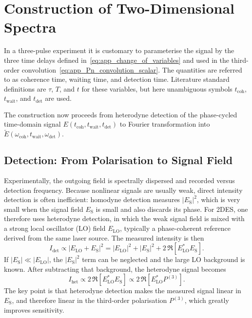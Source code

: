 \section{Construction of Two-Dimensional Spectra}
\label{sec:spctr_2D_construction_formal}
In a three-pulse experiment it is customary to parameterise the signal by the three time delays defined in~\autoref{eq:app_change_of_variables} and used in the third-order convolution~\autoref{eq:app_Pn_convolution_scalar}.
The quantities are referred to as coherence time, waiting time, and detection time. Literature standard definitions are $\tau$, $T$, and $t$ for these variables, but here unambiguous symbols $t_{\mathrm{coh}}$, $t_{\mathrm{wait}}$, and $t_{\mathrm{det}}$ are used.

The construction now proceeds from heterodyne detection of the phase-cycled time-domain signal $E(t_{\mathrm{coh}},t_{\mathrm{wait}},t_{\mathrm{det}})$ to Fourier transformation into $\tilde{E}(\omega_{\mathrm{coh}},t_{\mathrm{wait}},\omega_{\mathrm{det}})$.

\subsection{Detection: From Polarisation to Signal Field}
\label{sec:spctr_detection_schemes}
Experimentally, the outgoing field is spectrally dispersed and recorded versus detection frequency.
Because nonlinear signals are usually weak, direct intensity detection is often inefficient: homodyne detection measures $|E_{\mathrm{S}}|^2$, which is very small when the signal field $E_{\mathrm{S}}$ is small and also discards its phase.
For 2DES, one therefore uses heterodyne detection, in which the weak signal field is mixed with a strong local oscillator (LO) field $E_{\mathrm{LO}}$, typically a phase-coherent reference derived from the same laser source.
The measured intensity is then
\begin{equation*}
	I_{\mathrm{det}}
	\propto
	\left|E_{\mathrm{LO}}+E_{\mathrm{S}}\right|^2
	= |E_{\mathrm{LO}}|^2 + |E_{\mathrm{S}}|^2
	+ 2\,\Re\!\left[E_{\mathrm{LO}}^{*}E_{\mathrm{S}}\right].
\end{equation*}
If $|E_{\mathrm{S}}| \ll |E_{\mathrm{LO}}|$, the $|E_{\mathrm{S}}|^2$ term can be neglected and the large LO background is known. After subtracting that background, the heterodyne signal becomes
\begin{equation*}
	I_{\mathrm{het}}
	\propto
	2\,\Re\!\left[E_{\mathrm{LO}}^{*}E_{\mathrm{S}}\right]
	\propto
	2\,\Re\!\left[E_{\mathrm{LO}}^{*}P^{(3)}\right].
\end{equation*}
The key point is that heterodyne detection makes the measured signal linear in $E_{\mathrm{S}}$, and therefore linear in the third-order polarisation $P^{(3)}$, which greatly improves sensitivity.

